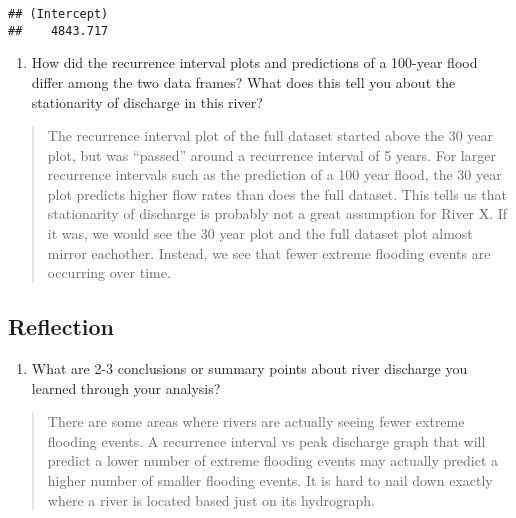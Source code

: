 \documentclass[]{article}
\newenvironment{Shaded}{\begin{snugshade}}{\end{snugshade}}
\newcommand{\CommentTok}[1]{\textcolor[rgb]{0.56,0.35,0.01}{\textit{#1}}}
\providecommand{\tightlist}{%
  \setlength{\itemsep}{0pt}\setlength{\parskip}{0pt}}
\begin{document}
\begin{verbatim}
## (Intercept) 
##    4843.717
\end{verbatim}

\begin{Shaded}
\end{Shaded}

\begin{enumerate}
\def\labelenumi{\arabic{enumi}.}
\setcounter{enumi}{11}
\tightlist
\item
  How did the recurrence interval plots and predictions of a 100-year
  flood differ among the two data frames? What does this tell you about
  the stationarity of discharge in this river?
\end{enumerate}

\begin{quote}
The recurrence interval plot of the full dataset started above the 30
year plot, but was ``passed'' around a recurrence interval of 5 years.
For larger recurrence intervals such as the prediction of a 100 year
flood, the 30 year plot predicts higher flow rates than does the full
dataset. This tells us that stationarity of discharge is probably not a
great assumption for River X. If it was, we would see the 30 year plot
and the full dataset plot almost mirror eachother. Instead, we see that
fewer extreme flooding events are occurring over time.
\end{quote}

\hypertarget{reflection}{%
\subsection{Reflection}\label{reflection}}

\begin{enumerate}
\def\labelenumi{\arabic{enumi}.}
\setcounter{enumi}{12}
\tightlist
\item
  What are 2-3 conclusions or summary points about river discharge you
  learned through your analysis?
\end{enumerate}

\begin{quote}
There are some areas where rivers are actually seeing fewer extreme
flooding events. A recurrence interval vs peak discharge graph that will
predict a lower number of extreme flooding events may actually predict a
higher number of smaller flooding events. It is hard to nail down
exactly where a river is located based just on its hydrograph.
\end{quote}
\end{document}
